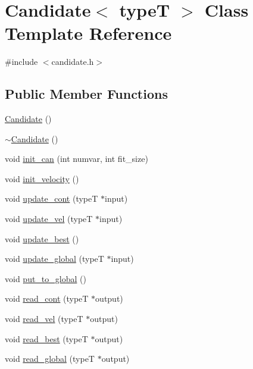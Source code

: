 \hypertarget{class_candidate}{}\section{Candidate$<$ type\+T $>$ Class Template Reference}
\label{class_candidate}


{\ttfamily \#include $<$candidate.\+h$>$}

\subsection*{Public Member Functions}
\begin{DoxyCompactItemize}
\item 
\hyperlink{class_candidate_ab25345414cf58c932561890e81f738e5}{Candidate} ()
\item 
\hyperlink{class_candidate_a300a421ab57bb83b6d5e02973fadb416}{$\sim$\+Candidate} ()
\item 
void \hyperlink{class_candidate_a7d6563ae2246654a7b3e4c34a8f38e7f}{init\+\_\+can} (int numvar, int fit\+\_\+size)
\item 
void \hyperlink{class_candidate_adb4ae80a8dc02e8cb85df4d8c651d53c}{init\+\_\+velocity} ()
\item 
void \hyperlink{class_candidate_abc542c3e498ddc6e1bbf016c28ba035a}{update\+\_\+cont} (type\+T $\ast$input)
\item 
void \hyperlink{class_candidate_a66100c3779eadc81ab5bacbd4fe1d4b7}{update\+\_\+vel} (type\+T $\ast$input)
\item 
void \hyperlink{class_candidate_a60027d49ca1f7684245a0f9fe2864f30}{update\+\_\+best} ()
\item 
void \hyperlink{class_candidate_abccd308b73aab3dd6c6403269fff2e66}{update\+\_\+global} (type\+T $\ast$input)
\item 
void \hyperlink{class_candidate_a68623f87b2353804a936704983de417f}{put\+\_\+to\+\_\+global} ()
\item 
void \hyperlink{class_candidate_a5f781b1a2e563492fb33449df4196897}{read\+\_\+cont} (type\+T $\ast$output)
\item 
void \hyperlink{class_candidate_a49f8e0f5b9a3ad4df2993ef2415552ce}{read\+\_\+vel} (type\+T $\ast$output)
\item 
void \hyperlink{class_candidate_adc8885a1bc7990d5060fb41fb0b84307}{read\+\_\+best} (type\+T $\ast$output)
\item 
void \hyperlink{class_candidate_ad8df30af1e76d0cbcc6563107877756e}{read\+\_\+global} (type\+T $\ast$output)

\end{DoxyCompactItemize}
